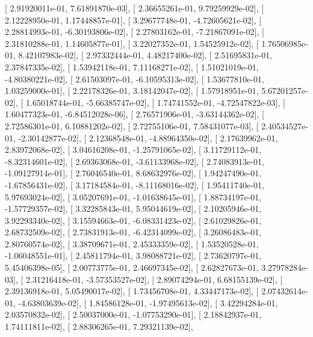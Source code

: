 \documentclass{article}
\begin{document}
       [  2.91920011e-01,   7.61891870e-03],
       [  2.36655261e-01,   9.79259929e-02],
       [  2.12228950e-01,   1.17448857e-01],
       [  3.29677748e-01,  -4.72605621e-02],
       [  2.28814993e-01,  -6.30193806e-02],
       [  2.27803162e-01,  -7.21867091e-02],
       [  2.31810288e-01,   1.14605877e-01],
       [  3.22027352e-01,   1.54525912e-02],
       [  1.76506985e-01,   8.42107983e-02],
       [  2.97332444e-01,   4.48217400e-02],
       [  2.51695831e-01,   2.37847335e-02],
       [  1.53942118e-01,   7.11168271e-02],
       [  1.51021019e-01,  -4.80380221e-02],
       [  2.61503097e-01,  -6.10595313e-02],
       [  1.53677810e-01,   1.03259000e-01],
       [  2.22178326e-01,   3.18142047e-02],
       [  1.57918951e-01,   5.67201257e-02],
       [  1.65018744e-01,  -5.66385747e-02],
       [  1.74741552e-01,  -4.72547822e-03],
       [  1.60477323e-01,  -6.84512028e-06],
       [  2.76571906e-01,  -3.63144362e-02],
       [  2.72586301e-01,   6.10881202e-02],
       [  2.72755106e-01,   7.58431077e-03],
       [  2.40534527e-01,  -2.30142877e-02],
       [  2.12368548e-01,  -4.88964350e-02],
       [  2.17639962e-01,   2.83972068e-02],
       [  3.04616208e-01,  -1.25791065e-02],
       [  3.11729112e-01,  -8.32314601e-02],
       [  2.69363068e-01,  -3.61133968e-02],
       [  2.74083913e-01,  -1.09127914e-01],
       [  2.76046540e-01,   8.68632976e-02],
       [  1.94247490e-01,  -1.67856431e-02],
       [  3.17184584e-01,  -8.11168016e-02],
       [  1.95411740e-01,   5.97693024e-02],
       [  3.05207691e-01,  -1.01638645e-01],
       [  1.88734197e-01,  -1.57729357e-02],
       [  3.32285843e-01,   5.95044619e-02],
       [  2.10205946e-01,   3.92293340e-02],
       [  3.15594663e-01,  -6.08331423e-02],
       [  2.61029826e-01,   2.68732509e-02],
       [  2.73831913e-01,  -6.42314099e-02],
       [  3.26086483e-01,   2.80760574e-02],
       [  3.38709671e-01,   2.45333359e-02],
       [  1.53520528e-01,  -1.06048551e-01],
       [  2.45811794e-01,   3.98088721e-02],
       [  2.73620797e-01,   5.45406398e-05],
       [  2.00773775e-01,   2.46697345e-02],
       [  2.62827673e-01,   3.27978284e-03],
       [  2.31216418e-01,  -3.57353527e-02],
       [  2.89074294e-01,   6.68155139e-02],
       [  2.39136918e-01,   5.05490017e-02],
       [  1.73456708e-01,   4.33447173e-02],
       [  2.07432614e-01,  -4.63803639e-02],
       [  1.84586128e-01,  -1.97495613e-02],
       [  3.42294284e-01,   2.03570832e-02],
       [  2.50037000e-01,  -1.07753290e-01],
       [  2.18842937e-01,   1.74111811e-02],
       [  2.88306265e-01,   7.29321139e-02],
\end{document}
